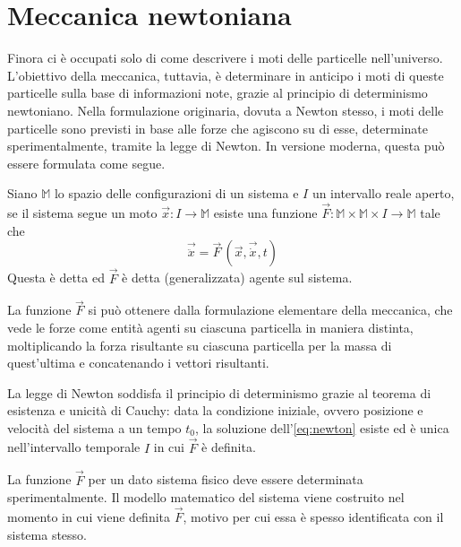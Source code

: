 \section{Meccanica newtoniana}
Finora ci è occupati solo di come descrivere i moti delle particelle nell'universo. L'obiettivo della meccanica, tuttavia, è determinare in anticipo i moti di queste particelle sulla base di informazioni note, grazie al principio di determinismo newtoniano. Nella formulazione originaria, dovuta a Newton stesso, i moti delle particelle sono previsti in base alle forze che agiscono su di esse, determinate sperimentalmente, tramite la legge di Newton. In versione moderna, questa può essere formulata come segue.
\begin{newton}
  Siano $\mathbb{M}$ lo spazio delle configurazioni di un sistema e $I$ un intervallo reale aperto, se il sistema segue un moto $\vec{x}:I \to \mathbb{M}$ esiste una funzione $\vec{F}:\mathbb{M} \times \mathbb{M} \times  I \to \mathbb{M}$ tale che \begin{equation}
  \vec{\ddot{x}} = \vec{F}\,(\vec{x},\vec{\dot{x}}, t) \label{eq:newton}
  \end{equation} 
  Questa è detta  ed $\vec{F}$ è detta  (generalizzata) agente sul sistema.
\end{newton}
\begin{remark}
  La funzione $\vec{F}$ si può ottenere dalla formulazione elementare della meccanica, che vede le forze come entità agenti su ciascuna particella in maniera distinta, moltiplicando la forza risultante su ciascuna particella per la massa di quest'ultima e concatenando i vettori risultanti.
\end{remark}
\begin{remark}
  La legge di Newton soddisfa il principio di determinismo grazie al teorema di esistenza e unicità di Cauchy: data la condizione iniziale, ovvero posizione e velocità del sistema a un tempo $t_0$, la soluzione dell'\autoref{eq:newton} esiste ed è unica nell'intervallo temporale $I$ in cui $\vec{F}$ è definita.
\end{remark}
La funzione $\vec{F}$ per un dato sistema fisico deve essere determinata sperimentalmente. Il modello matematico del sistema viene costruito nel momento in cui viene definita $\vec{F}$, motivo per cui essa è spesso identificata con il sistema stesso.

